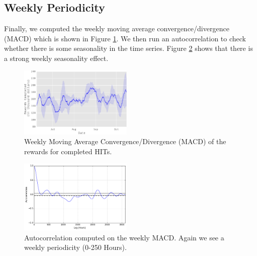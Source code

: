 \subsection{Weekly Periodicity}
Finally, we computed the weekly moving average convergence/divergence (MACD) which is shown in Figure \ref{fig:mac}. We then run an autocorrelation to check whether there is some seasonality in the time series. Figure \ref{fig:autocorrelation2} shows that there is a strong weekly seasonality effect.
\begin{figure}[tb]
	\centering
		\includegraphics[width=0.48\textwidth]{figures/mac}
	\caption{Weekly Moving Average Convergence/Divergence (MACD) of the rewards for completed HITs.}
	\label{fig:mac}
\end{figure}
\begin{figure}[tb]
	\centering
		\includegraphics[width=0.48\textwidth]{figures/autocorrelation2}
	\caption{Autocorrelation computed on the weekly MACD. Again we see a weekly periodicity (0-250 Hours).}
	\label{fig:autocorrelation2}
\end{figure}
